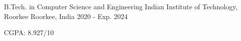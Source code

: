 

\begin{cventries}

  \cventry
    {B.Tech. in Computer Science and Engineering} %
    {Indian Institute of Technology, Roorkee} %
    {Roorkee, India} %
    {2020 - Exp. 2024} %
    {
      \begin{cvitems} %
        \item {CGPA: 8.927/10}
      \end{cvitems}
    }

\end{cventries}
